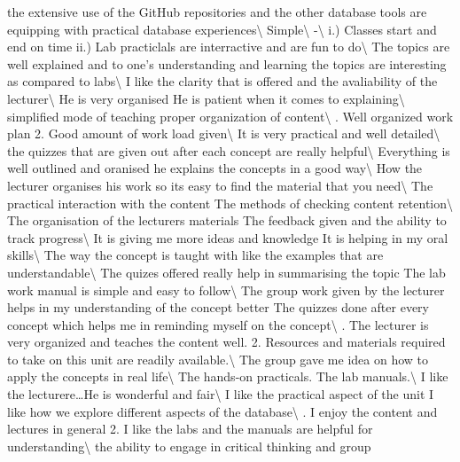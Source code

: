 \documentclass[
]{article}
\begin{document}
the extensive use of the GitHub repositories and the other database
tools are equipping with practical database experiences\textbackslash{}
\hline Simple\textbackslash{} \hline -\textbackslash{} \hline i.)
Classes start and end on time ii.) Lab practiclals are interractive and
are fun to do\textbackslash{} \hline The topics are well explained and
to one's understanding and learning the topics are interesting as
compared to labs\textbackslash{} \hline I like the clarity that is
offered and the avaliability of the lecturer\textbackslash{} \hline He
is very organised He is patient when it comes to
explaining\textbackslash{} \hline simplified mode of teaching proper
organization of content\textbackslash{} . Well organized work plan 2. Good amount of work load
given\textbackslash{} \hline It is very practical and well
detailed\textbackslash{} \hline the quizzes that are given out after
each concept are really helpful\textbackslash{} \hline Everything is
well outlined and oranised he explains the concepts in a good
way\textbackslash{} \hline How the lecturer organises his work so its
easy to find the material that you need\textbackslash{} \hline The
practical interaction with the content The methods of checking content
retention\textbackslash{} \hline The organisation of the lecturers
materials The feedback given and the ability to track
progress\textbackslash{} \hline It is giving me more ideas and knowledge
It is helping in my oral skills\textbackslash{} \hline The way the
concept is taught with like the examples that are
understandable\textbackslash{} \hline The quizes offered really help in
summarising the topic The lab work manual is simple and easy to
follow\textbackslash{} \hline The group work given by the lecturer helps
in my understanding of the concept better The quizzes done after every
concept which helps me in reminding myself on the
concept\textbackslash{} . The lecturer is very organized and teaches the content well. 2.
Resources and materials required to take on this unit are readily
available.\textbackslash{} \hline The group gave me idea on how to apply
the concepts in real life\textbackslash{} \hline The hands-on
practicals. The lab manuals.\textbackslash{} \hline I like the
lecturere\ldots He is wonderful and fair\textbackslash{} \hline I like
the practical aspect of the unit I like how we explore different aspects
of the database\textbackslash{} . I enjoy the content and lectures in general 2. I like the labs and
the manuals are helpful for understanding\textbackslash{} \hline the
ability to engage in critical thinking and group
\end{document}
